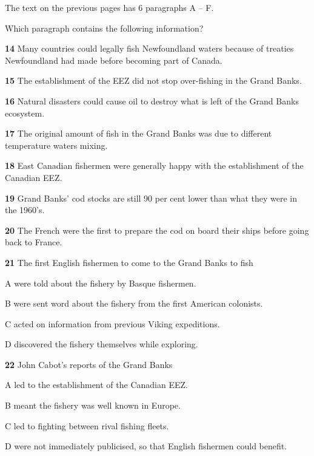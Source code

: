\documentclass{../templateReading/cdreading}
\begin{document}

The text on the previous pages has 6 paragraphs A – F.

Which paragraph contains the following information?


\textbf{14} Many countries could legally fish Newfoundland waters because of treaties Newfoundland had made before becoming part of Canada.

\textbf{15} The establishment of the EEZ did not stop over-fishing in the Grand Banks.

\textbf{16} Natural disasters could cause oil to destroy what is left of the Grand Banks ecosystem.

\textbf{17} The original amount of fish in the Grand Banks was due to different temperature waters mixing.

\textbf{18} East Canadian fishermen were generally happy with the establishment of the Canadian EEZ.

\textbf{19} Grand Banks’ cod stocks are still 90 per cent lower than what they were in the 1960’s.

\textbf{20} The French were the first to prepare the cod on board their ships before going back to France.




\textbf{21} The first English fishermen to come to the Grand Banks to fish

A   were told about the fishery by Basque fishermen.

B   were sent word about the fishery from the first American colonists.

C   acted on information from previous Viking expeditions.

D   discovered the fishery themselves while exploring.

\textbf{22} John Cabot’s reports of the Grand Banks

A   led to the establishment of the Canadian EEZ.

B   meant the fishery was well known in Europe.

C   led to fighting between rival fishing fleets.

D   were not immediately publicised, so that English fishermen could benefit.
\end{document}
